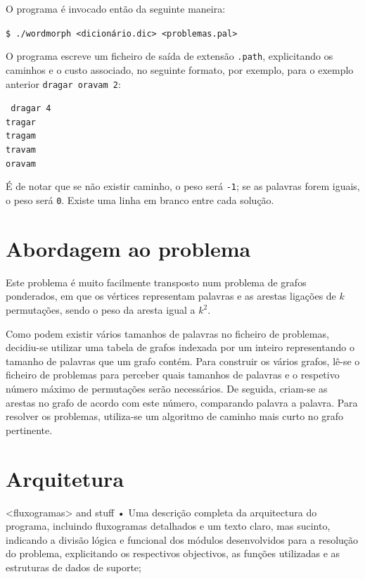 \documentclass[a4paper, 18pt]{article}
\begin{document}
	\par
	O programa é invocado então da seguinte maneira:
	\begin{center}
		\texttt{\$ ./wordmorph <dicionário.dic> <problemas.pal>}
	\end{center}
	\par
	O programa escreve um ficheiro de saída de extensão \texttt{.path}, explicitando os caminhos e o custo associado, no seguinte formato, por exemplo, para o exemplo anterior \texttt{dragar oravam 2}:
	\begin{center}
		\texttt{
		dragar 4\\
		tragar \\
		tragam \\
		travam \\
		oravam}
	\end{center}
	\par
	É de notar que se não existir caminho, o peso será \texttt{-1}; se as palavras forem iguais, o peso será \texttt{0}. Existe uma linha em branco entre cada solução.


\section{Abordagem ao problema}
	\par
	Este problema é muito facilmente transposto num problema de grafos ponderados, em que os vértices representam palavras e as arestas ligações de $k$ permutações, sendo o peso da aresta igual a $k^2$.
	\par
	Como podem existir vários tamanhos de palavras no ficheiro de problemas, decidiu-se utilizar uma tabela de grafos indexada por um inteiro representando o tamanho de palavras que um grafo contém. Para construir os vários grafos, lê-se o ficheiro de problemas para perceber quais tamanhos de palavras e o respetivo número máximo de permutações serão necessários. De seguida, criam-se as arestas no grafo de acordo com este número, comparando palavra a palavra. Para resolver os problemas, utiliza-se um algoritmo de caminho mais curto no grafo pertinente.


\section{Arquitetura}
	<fluxogramas> and stuff
• Uma descrição completa da arquitectura do programa, incluindo fluxogramas
detalhados e um texto claro, mas sucinto, indicando a divisão lógica e funcional dos
módulos desenvolvidos para a resolução do problema, explicitando os respectivos
objectivos, as funções utilizadas e as estruturas de dados de suporte;
\end{document}
